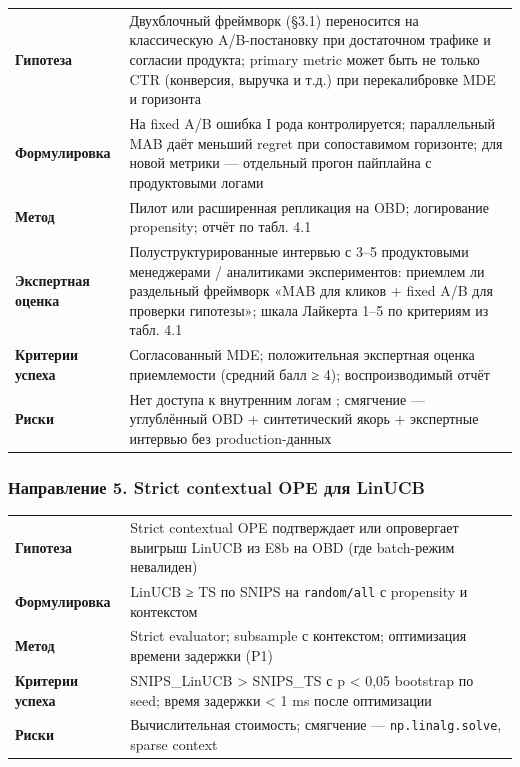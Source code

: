 \begingroup\footnotesize\setlength{\tabcolsep}{4pt}
\begin{xltabular}{\linewidth}{@{}
  >{\raggedright\arraybackslash}Y
  >{\raggedright\arraybackslash}Y@{}}
\toprule\noalign{}
\midrule\noalign{}
\endhead
\bottomrule\noalign{}
\endlastfoot
\textbf{Гипотеза} & Двухблочный фреймворк (§3.1) переносится на классическую A/B-постановку при достаточном трафике и согласии продукта; primary metric может быть не только CTR (конверсия, выручка и т.д.) при перекалибровке MDE и горизонта \\
\textbf{Формулировка} & На fixed A/B ошибка I рода контролируется; параллельный MAB даёт меньший regret при сопоставимом горизонте; для новой метрики --- отдельный прогон пайплайна с продуктовыми логами \\
\textbf{Метод} & Пилот или расширенная репликация на OBD; логирование propensity; отчёт по табл. 4.1 \\
\textbf{Экспертная оценка} & Полуструктурированные интервью с 3--5 продуктовыми менеджерами / аналитиками экспериментов: приемлем ли раздельный фреймворк «MAB для кликов + fixed A/B для проверки гипотезы»; шкала Лайкерта 1--5 по критериям из табл. 4.1 \\
\textbf{Критерии успеха} & Согласованный MDE; положительная экспертная оценка приемлемости (средний балл ≥ 4); воспроизводимый отчёт \\
\textbf{Риски} & Нет доступа к внутренним логам \cite{ref18}; смягчение --- углублённый OBD + синтетический якорь + экспертные интервью без production-данных \\
\end{xltabular}
\endgroup

\subsubsection{Направление 5. Strict contextual OPE для LinUCB}\label{ux43dux430ux43fux440ux430ux432ux43bux435ux43dux438ux435-5.-strict-contextual-ope-ux434ux43bux44f-linucb}

\begingroup\footnotesize\setlength{\tabcolsep}{4pt}
\begin{xltabular}{\linewidth}{@{}
  >{\raggedright\arraybackslash}Y
  >{\raggedright\arraybackslash}Y@{}}
\toprule\noalign{}
\midrule\noalign{}
\endhead
\bottomrule\noalign{}
\endlastfoot
\textbf{Гипотеза} & Strict contextual OPE \cite{ref6,ref28} подтверждает или опровергает выигрыш LinUCB из E8b на OBD (где batch-режим невалиден) \\
\textbf{Формулировка} & LinUCB ≥ TS по SNIPS на \texttt{random/all} с propensity и контекстом \\
\textbf{Метод} & Strict evaluator; subsample с контекстом; оптимизация времени задержки (P1) \\
\textbf{Критерии успеха} & SNIPS\_LinUCB \textgreater{} SNIPS\_TS с p \textless{} 0,05 bootstrap по seed; время задержки \textless{} 1 ms после оптимизации \\
\textbf{Риски} & Вычислительная стоимость; смягчение --- \texttt{np.linalg.solve}, sparse context \\
\end{xltabular}
\endgroup

